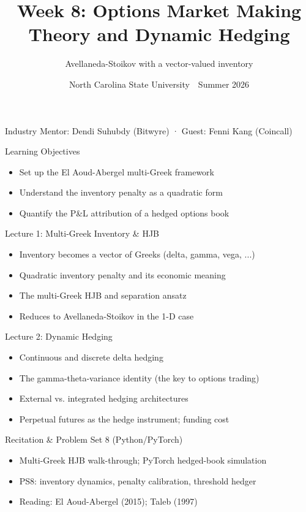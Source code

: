 \documentclass[aspectratio=169,11pt]{beamer}
\title{Week 8: Options Market Making Theory and Dynamic Hedging}
\subtitle{Avellaneda-Stoikov with a vector-valued inventory}
\date{North Carolina State University \,\textbar\, Summer 2026}
\begin{document}
\begin{frame}[plain]\titlepage
\begin{center}\tiny Industry Mentor: Dendi Suhubdy (Bitwyre)  ·  Guest: Fenni Kang (Coincall)\end{center}\end{frame}
\begin{frame}{Learning Objectives}
\begin{itemize}
  \item Set up the El Aoud-Abergel multi-Greek framework
  \item Understand the inventory penalty as a quadratic form
  \item Quantify the P\&L attribution of a hedged options book
\end{itemize}\end{frame}
\begin{frame}{Lecture 1: Multi-Greek Inventory \& HJB}
\begin{itemize}
  \item Inventory becomes a vector of Greeks (delta, gamma, vega, ...)
  \item Quadratic inventory penalty and its economic meaning
  \item The multi-Greek HJB and separation ansatz
  \item Reduces to Avellaneda-Stoikov in the 1-D case
\end{itemize}\end{frame}
\begin{frame}{Lecture 2: Dynamic Hedging}
\begin{itemize}
  \item Continuous and discrete delta hedging
  \item The gamma-theta-variance identity (the key to options trading)
  \item External vs. integrated hedging architectures
  \item Perpetual futures as the hedge instrument; funding cost
\end{itemize}\end{frame}
\begin{frame}{Recitation \& Problem Set 8 (Python/PyTorch)}
\begin{itemize}
  \item Multi-Greek HJB walk-through; PyTorch hedged-book simulation
  \item PS8: inventory dynamics, penalty calibration, threshold hedger
  \item Reading: El Aoud-Abergel (2015); Taleb (1997)
\end{itemize}\end{frame}
\end{document}

